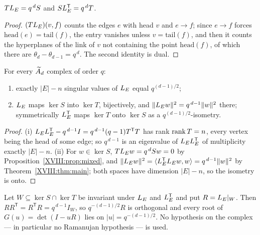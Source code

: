\begin{proposition}\label{XVIII:prop:mixed}
$TL_E=q^{\,d}S$ and $SL_E^{\mathsf T}=q^{\,d}T$.
\end{proposition}

\begin{proof}
$(TL_E)(v,f)$ counts the edges $e$ with head $v$ and $e\to f$; since $e\to f$ forces
$\mathrm{head}(e)=\mathrm{tail}(f)$, the entry vanishes unless $v=\mathrm{tail}(f)$, and
then it counts the hyperplanes of the link of $v$ not containing the point
$\mathrm{head}(f)$, of which there are $\theta_d-\theta_{d-1}=q^{\,d}$. The second
identity is dual.
\end{proof}

\begin{corollary}\label{XVIII:cor:uncond}
For every $\widetilde A_{d}$ complex of order $q$:
\begin{enumerate}
\item[(i)] exactly $|E|-n$ singular values of $L_E$ equal $q^{(d-1)/2}$;
\item[(ii)] $L_E$ maps $\ker S$ into $\ker T$, bijectively, and
$\|L_E w\|^2=q^{\,d-1}\|w\|^2$ there; symmetrically $L_E^{\mathsf T}$ maps $\ker T$ onto
$\ker S$ as a $q^{(d-1)/2}$-isometry.
\end{enumerate}
\end{corollary}

\begin{proof}
(i) $L_EL_E^{\mathsf T}-q^{\,d-1}I=q^{\,d-1}(q-1)T^{\mathsf T}T$ has rank
$\operatorname{rank} T=n$, every vertex being the head of some edge; so $q^{\,d-1}$ is an eigenvalue of
$L_EL_E^{\mathsf T}$ of multiplicity exactly $|E|-n$. (ii) For $w\in\ker S$,
$TL_E w=q^{\,d}Sw=0$ by Proposition~\ref{XVIII:prop:mixed}, and
$\|L_E w\|^2=\langle L_E^{\mathsf T}L_E w,w\rangle=q^{\,d-1}\|w\|^2$ by
Theorem~\ref{XVIII:thm:main}; both spaces have dimension $|E|-n$, so the isometry is onto.
\end{proof}

\begin{corollary}\label{XVIII:cor:circle}
Let $W\subseteq\ker S\cap\ker T$ be invariant under $L_E$ and $L_E^{\mathsf T}$ and put
$R=L_E|_W$. Then $RR^{\mathsf T}=R^{\mathsf T}R=q^{\,d-1}I_W$, so $q^{-(d-1)/2}R$ is
orthogonal and every root of $G(u)=\det(I-uR)$ lies on $|u|=q^{-(d-1)/2}$. No hypothesis
on the complex --- in particular no Ramanujan hypothesis --- is used.
\end{corollary}

